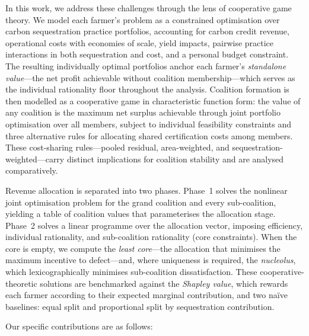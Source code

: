 \documentclass[manuscript, screen, review, anonymous]{acmart}
\begin{document}
In this work, we address these challenges through the lens of cooperative game theory. We model each farmer's problem as a constrained optimisation over carbon sequestration practice portfolios, accounting for carbon credit revenue, operational costs with economies of scale, yield impacts, pairwise practice interactions in both sequestration and cost, and a personal budget constraint. The resulting individually optimal portfolios anchor each farmer's \emph{standalone value}---the net profit achievable without coalition membership---which serves as the individual rationality floor throughout the analysis. Coalition formation is then modelled as a cooperative game in characteristic function form: the value of any coalition is the maximum net surplus achievable through joint portfolio optimisation over all members, subject to individual feasibility constraints and three alternative rules for allocating shared certification costs among members. These cost-sharing rules---pooled residual, area-weighted, and sequestration-weighted---carry distinct implications for coalition stability and are analysed comparatively.

Revenue allocation is separated into two phases. Phase~1 solves the nonlinear joint optimisation problem for the grand coalition and every sub-coalition, yielding a table of coalition values that parameterises the allocation stage. Phase~2 solves a linear programme over the allocation vector, imposing efficiency, individual rationality, and sub-coalition rationality (core constraints). When the core is empty, we compute the \emph{least core}---the allocation that minimises the maximum incentive to defect---and, where uniqueness is required, the \emph{nucleolus}, which lexicographically minimises sub-coalition dissatisfaction. These cooperative-theoretic solutions are benchmarked against the \emph{Shapley value}, which rewards each farmer according to their expected marginal contribution, and two na\"{i}ve baselines: equal split and proportional split by sequestration contribution.

Our specific contributions are as follows:
\end{document}

